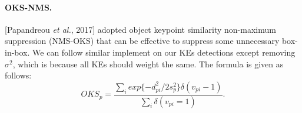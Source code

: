 \documentclass{article}
\begin{document}
\paragraph{OKS-NMS.} [Papandreou \textit{et al.}, 2017] adopted object keypoint similarity non-maximum suppression (NMS-OKS) that can be effective to suppress some unnecessary box-in-box. We can follow similar implement on our KEs detections except removing $\sigma^{2}$, which is because all KEs should weight the same. The formula is given as follows:
\begin{equation}\label{eq:oes}
  OKS_{p}= \frac{\sum_{i}exp\{-d_{pi}^{2}/2s_{p}^{2}\}\delta(v_{pi}-1)}{\sum_{i}\delta(v_{pi} = 1)}.
\end{equation}
\end{document}
